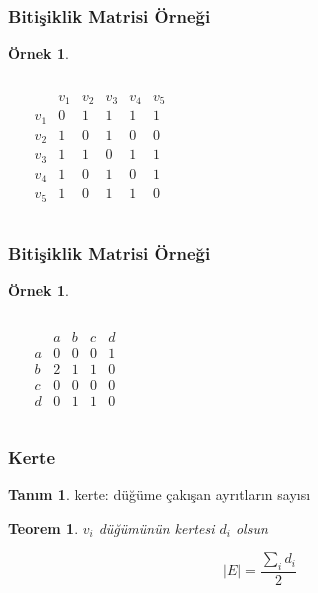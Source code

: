 \documentclass[dvipsnames]{beamer}
\theoremstyle{definition}
\newtheorem{tanim}[theorem]{Tanım}
\theoremstyle{example}
\newtheorem{ornek}[theorem]{Örnek}
\theoremstyle{plain}
\newtheorem{teorem}[theorem]{Teorem}
\begin{document}
\begin{frame}
  \frametitle{Bitişiklik Matrisi Örneği}

  \begin{ornek}
    \begin{columns}
      \begin{center}
      \end{center}

      \[
        \begin{array}{c|ccccc}
                & v_1 & v_2 & v_3 & v_4 & v_5\\\hline
            v_1 & 0 & 1 & 1 & 1 & 1\\
            v_2 & 1 & 0 & 1 & 0 & 0\\
            v_3 & 1 & 1 & 0 & 1 & 1\\
            v_4 & 1 & 0 & 1 & 0 & 1\\
            v_5 & 1 & 0 & 1 & 1 & 0
        \end{array}
      \]
    \end{columns}
  \end{ornek}
\end{frame}

\begin{frame}
  \frametitle{Bitişiklik Matrisi Örneği}

  \begin{ornek}
    \begin{columns}
    \begin{center}
    \end{center}

      \[
        \begin{array}{c|cccc}
              & a & b & c & d\\\hline
            a & 0 & 0 & 0 & 1\\
            b & 2 & 1 & 1 & 0\\
            c & 0 & 0 & 0 & 0\\
            d & 0 & 1 & 1 & 0
        \end{array}
      \]
    \end{columns}
  \end{ornek}
\end{frame}

\begin{frame}
  \frametitle{Kerte}

  \begin{tanim}
    \alert{kerte}: düğüme çakışan ayrıtların sayısı
  \end{tanim}

  \pause
  \begin{teorem}
    $v_i$ düğümünün kertesi $d_i$ olsun

    \[ |E| = \frac{\sum_i d_i}{2} \]
  \end{teorem}
\end{frame}
\end{document}

